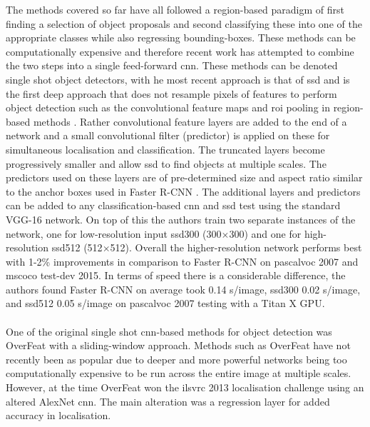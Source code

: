 The methods covered so far have all followed a region-based paradigm of first finding a selection of object proposals and second classifying these into one of the appropriate classes while also regressing bounding-boxes. These methods can be computationally expensive and therefore recent work has attempted to combine the two steps into a single feed-forward \gls{cnn}. These methods can be denoted single shot object detectors, with he most recent approach is that of \gls{ssd} \cite{ssd} and is the first deep approach that does not resample pixels of features to perform object detection such as the convolutional feature maps and \gls {roi} pooling in region-based methods \cite{fastrcnn} \cite{fasterrcnn}. Rather convolutional feature layers are added to the end of a network and a small convolutional filter (predictor) is applied on these for simultaneous localisation and classification. The truncated layers become progressively smaller and allow \gls{ssd} to find objects at multiple scales. The predictors used on these layers are of pre-determined size and aspect ratio similar to the anchor boxes used in Faster R-CNN \cite{fasterrcnn}. The additional layers and predictors can be added to any classification-based \gls{cnn} and \gls{ssd} test using the standard VGG-16 network. On top of this the authors train two separate instances of the network, one for low-resolution input \gls{ssd}300 (300$\times$300) and one for high-resolution \gls{ssd}512 (512$\times$512). Overall the higher-resolution network performs best with 1-2\% improvements in comparison to Faster R-CNN on \gls{pascalvoc} 2007 and \gls{mscoco} test-dev 2015. In terms of speed there is a considerable difference, the authors found Faster R-CNN on average took 0.14 s/image, \gls{ssd}300 0.02 s/image, and \gls{ssd}512 0.05 s/image on \gls{pascalvoc} 2007 testing with a Titan X GPU. 
\\\\
One of the original single shot \gls{cnn}-based methods for object detection was OverFeat \cite{overfeat} with a sliding-window approach. Methods such as OverFeat have not recently been as popular due to deeper and more powerful networks being too computationally expensive to be run across the entire image at multiple scales. However, at the time OverFeat won the \gls{ilsvrc} 2013 localisation challenge using an altered AlexNet \cite{alexnet} \gls{cnn}. The main alteration was a regression layer for added accuracy in localisation.
\\\\
